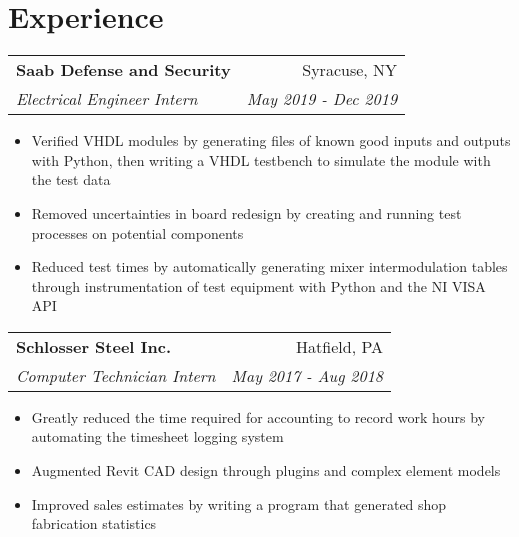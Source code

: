 \documentclass[letterpaper,11pt]{article}
\makeatletter
\newcommand{\resumeItem}[1]{
  \item\small{
    #1 \vspace{-4pt}
  }
}
\newcommand{\resumeSubheading}[4]{
  \vspace{2pt}
    \begin{tabular*}{0.97\textwidth}[t]{l@{\extracolsep{\fill}}r}
	\textbf{#1} & #2 \\
	\textit{\small#3}  & \textit{\small#4} \\
    \end{tabular*} \vspace{-5pt}
}
\newcommand{\resumeSubHeadingListStart}{\begin{itemize}[leftmargin=*]}
\newcommand{\resumeSubHeadingListEnd}{\end{itemize}}
\makeatother
\begin{document}
\section{Experience}

    \resumeSubheading
      {Saab Defense and Security}{Syracuse, NY}
      {Electrical Engineer Intern}{May 2019 - Dec 2019}

    \resumeSubHeadingListStart
      \resumeItem{Verified VHDL modules by generating files of known good inputs and outputs with Python, then writing a VHDL testbench to simulate the module with the test data}
      \resumeItem{Removed uncertainties in board redesign by creating and running test processes on potential components} 
      \resumeItem{Reduced test times by automatically generating mixer intermodulation tables through instrumentation of test equipment with Python and the NI VISA API}
    \resumeSubHeadingListEnd

    \resumeSubheading
      {Schlosser Steel Inc.}{Hatfield, PA}
      {Computer Technician Intern}{May 2017 - Aug 2018}
      \resumeSubHeadingListStart
        \resumeItem{Greatly reduced the time required for accounting to record work hours by automating the timesheet logging system} 
        \resumeItem{Augmented Revit CAD design through plugins and complex element models} 
        \resumeItem{Improved sales estimates by writing a program that generated shop fabrication statistics}
    \resumeSubHeadingListEnd
      


\end{document}
